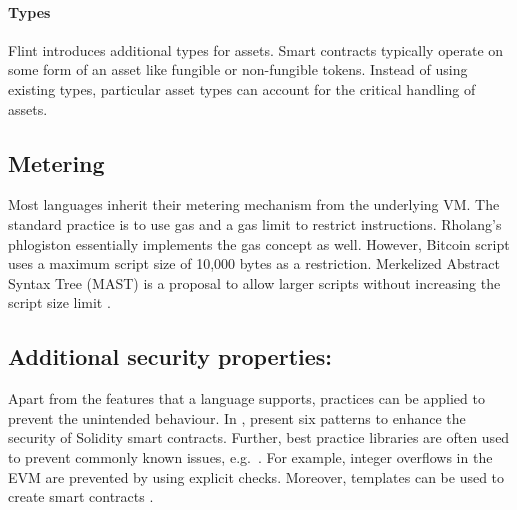 \paragraph{Types}
Flint introduces additional types for assets. Smart contracts typically operate on some form of an asset like fungible or non-fungible tokens. Instead of using existing types, particular asset types can account for the critical handling of assets.

\subsection{Metering}
Most languages inherit their metering mechanism from the underlying VM. The standard practice is to use gas and a gas limit to restrict instructions. Rholang's phlogiston essentially implements the gas concept as well.
However, Bitcoin script uses a maximum script size of 10,000 bytes as a restriction. Merkelized Abstract Syntax Tree (MAST) is a proposal to allow larger scripts without increasing the script size limit \cite{Harding2017}.

\subsection{Additional security properties:} 
Apart from the features that a language supports, practices can be applied to prevent the unintended behaviour.
In \cite{Wohrer2018}, present six patterns to enhance the security of Solidity smart contracts.
Further, best practice libraries are often used to prevent commonly known issues, e.g.\ \cite{ConsenSys2018Security}.
For example, integer overflows in the EVM are prevented by using explicit checks.
Moreover, templates can be used to create smart contracts \cite{Clack2016}.
